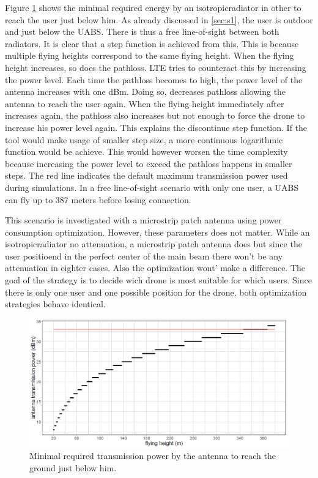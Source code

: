 Figure \ref{fig:ptxfh} shows the minimal required energy by an \gls{isotropicradiator} in other to reach the user just below him.
As already discussed in \ref{sec:s1}, the user is outdoor and just below the \gls{UABS}. There is thus a free line-of-sight between both
radiators. It is clear that a step function is achieved from this. This is because multiple flying heights correspond to the same flying height.
When the flying height increases, so does the pathloss. \gls{LTE} tries to counteract this by increasing the power level. Each time 
the pathloss becomes to high, the power level of the antenna increases with one dBm. Doing so, decreases pathloss allowing the antenna to reach
the user again. When the flying height immediately after increases again, the pathloss also increases but not enough to force the drone to 
increase his power level again. This explains the discontinue step function. If the tool would make usage of smaller step size, a more continuous 
logarithmic function would be achieve. This would however worsen the time complexity because increasing the power level to exceed the pathloss
 happens in smaller steps. The red line indicates the default maximum transmission power used during simulations. 
In a free line-of-sight scenario with only one user, a \gls{UABS} can fly up to 387 meters before losing connection.

This scenario is investigated with a microstrip patch antenna using power consumption optimization. However, these parameters does not matter.
While an \gls{isotropicradiator} no attenuation, a microstrip patch antenna does but since the user positioend in the perfect center of the main beam there
won't be any attenuation in eighter cases. Also the optimization wont' make a difference. The goal of the  strategy is to decide wich drone is most suitable for which
users. Since there is only one user and one possible position for the drone, both optimization strategies behave identical.

\begin{figure}[h!]
  \includegraphics[width=\textwidth]{../results/s1/ptx-fh2.png}
  \caption{Minimal required transmission power by the antenna to reach the ground just below him.}
  \label{fig:ptxfh}
\end{figure}

